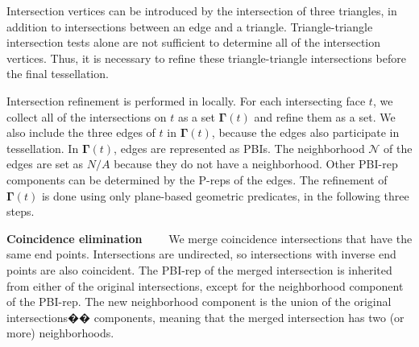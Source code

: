 \label{sec:refine}

Intersection vertices can be introduced by the intersection of three triangles, in addition to intersections between an edge and a triangle. Triangle-triangle intersection tests alone are not sufficient to determine all of the intersection vertices. Thus, it is necessary to refine these triangle-triangle intersections before the final tessellation.

Intersection refinement is performed in locally. For each intersecting face $t$, we collect all of the intersections on $t$ as a set $\bm{\Gamma}(t)$ and refine them as a set. We also include the three edges of $t$ in $\bm{\Gamma}(t)$, because the edges also participate in tessellation. In $\bm{\Gamma}(t)$, edges are represented as PBIs. The neighborhood $\mathcal{N}$ of the edges are set as $N/A$ because they do not have a neighborhood. Other PBI-rep components can be determined by the P-reps of the edges. The refinement of $\bm{\Gamma}(t)$ is done using only plane-based geometric predicates, in the following three steps.


\vspace{0.5em}
\noindent \textbf{Coincidence elimination}~~~~
We merge coincidence intersections that have the same end points. Intersections are undirected, so intersections with inverse end points are also coincident. The PBI-rep of the merged intersection is inherited from either of the original intersections, except for the neighborhood component of the PBI-rep. The new neighborhood component is the union of the original intersections�� components, meaning that the merged intersection has two (or more) neighborhoods.

